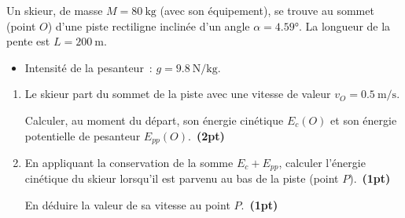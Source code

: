 \begin{minipage}{0.46\linewidth}
    Un skieur, de masse $M=\qty{80}{\kg}$ (avec son équipement), se trouve au
    sommet (point $O$) d'une piste rectiligne inclinée d'un angle
    $\alpha=\ang{4.59}$. La longueur de la pente est $L=\qty{200}{\m}$.

    \begin{donnees}
        \begin{itemize}
            \item Intensité de la pesanteur~: $g=\qty{9.8}{\N\per\kg}$.
        \end{itemize}
    \end{donnees}
\end{minipage}
\hfill
\begin{minipage}{0.53\linewidth}
\begin{figure}[H]
    \centering
\end{figure}
\end{minipage}
\begin{enumerate}
    \item Le skieur part du sommet de la piste avec une vitesse de valeur
          $v_{O}=\qty{0.5}{\m\per\s}$.
    
          Calculer, au moment du départ, son énergie cinétique $E_{c}(O)$ et son
          énergie potentielle de pesanteur $E_{pp}(O)$.~\textbf{(2pt)}
    \item En appliquant la conservation de la somme $E_{c}+E_{pp}$, calculer
          l'énergie cinétique du skieur lorsqu'il est parvenu au
          bas de la piste (point $P$).~\textbf{(1pt)}

          En déduire la valeur de sa vitesse au point $P$.~\textbf{(1pt)}
\end{enumerate}

